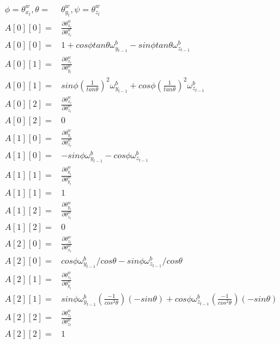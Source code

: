 \documentclass[conference]{IEEEtran}
\begin{document}
\begin{align*}
\phi =  \theta_{x_{t}}^{w}, \theta =&  \theta_{y_{t}}^{w}, \psi =  \theta_{z_{t}}^{w}\\
A[0][0] =& \frac{\partial \theta_{x_{t}}^{w}}{\partial \theta_{x_{t}}^{w}}\\
A[0][0] =& 1 + cos\phi tan\theta \omega_{y_{t-1}}^b - sin\phi tan\theta  \omega_{z_{t-1}}^b \\
A[0][1] =& \frac{\partial \theta_{x_{t}}^{w}}{\partial \theta_{y_{t}}^{w}}\\
A[0][1] =& sin\phi (\frac{1}{tan\theta})^2 \omega_{y_{t-1}}^b +  cos\phi (\frac{1}{tan\theta})^2  \omega_{z_{t-1}}^b \\
A[0][2] =& \frac{\partial \theta_{x_{t}}^{w}}{\partial \theta_{z_{t}}^{w}}\\
A[0][2] =& 0 \\
A[1][0] =& \frac{\partial \theta_{y_{t}}^{w}}{\partial \theta_{x_{t}}^{w}}\\
A[1][0] =& -sin\phi \omega_{y_{t-1}}^b -cos\phi \omega_{z_{t-1}}^b  \\
A[1][1] =& \frac{\partial \theta_{y_{t}}^{w}}{\partial \theta_{y_{t}}^{w}}\\
A[1][1] =& 1  \\
A[1][2] =& \frac{\partial \theta_{y_{t}}^{w}}{\partial \theta_{z_{t}}^{w}}\\
A[1][2] =& 0\\
A[2][0] =& \frac{\partial \theta_{z_{t}}^{w}}{\partial \theta_{x_{t}}^{w}}\\
A[2][0] =& cos\phi \omega_{y_{t-1}}^b / cos \theta - sin\phi \omega_{z_{t-1}}^b / cos\theta \\
A[2][1] =& \frac{\partial \theta_{z_{t}}^{w}}{\partial \theta_{y_{t}}^{w}}\\
A[2][1] =& sin\phi \omega_{y_{t-1}}^b (\frac{-1}{cos^2 \theta})(-sin\theta)  + cos\phi \omega_{z_{t-1}}^b (\frac{-1}{cos^2 \theta})(-sin\theta) \\
A[2][2] =& \frac{\partial \theta_{z_{t}}^{w}}{\partial \theta_{z_{t}}^{w}}\\
A[2][2] =& 1 \\
\end{align*}
\end{document}
